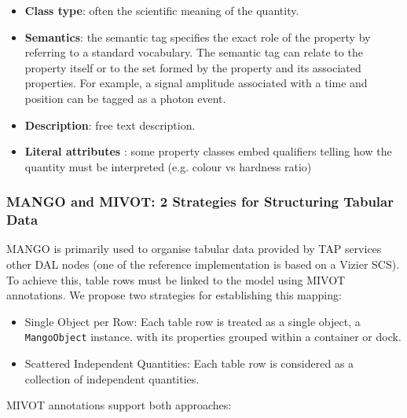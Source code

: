 \documentclass[11pt,a4paper]{ivoa}
\begin{document}
\begin{itemize}[noitemsep,topsep=0pt,parsep=0pt,partopsep=0pt]
    \item \textbf{Class type}: often the scientific meaning of the quantity.
    \item \textbf{Semantics}: the semantic tag specifies the exact role of the property by
          referring to a standard vocabulary. The semantic tag can relate to the property itself
          or to the set formed by the property and its associated properties.
          For example, a signal amplitude associated with a time and position can be tagged
          as a photon event.
    \item \textbf{Description}: free text description.
    \item \textbf{Literal attributes} : some property classes embed qualifiers telling 
          how the quantity must be interpreted (e.g. colour vs hardness ratio)
\end{itemize}


\subsubsection{MANGO and MIVOT: 2 Strategies for Structuring Tabular Data}

MANGO is primarily used to organise tabular data provided by TAP services \citep{2019ivoa.spec.0927D} 
other DAL nodes (one of the reference implementation is based on a Vizier SCS).
To achieve this, table rows must be linked to the model using MIVOT annotations.
We propose two strategies for establishing this mapping:
\begin{itemize}[noitemsep,topsep=0pt,parsep=0pt,partopsep=0pt]
    \item Single Object per Row: Each table row is treated as a single object, a \texttt{MangoObject} instance.
          with its properties grouped within a container or dock.
    \item Scattered Independent Quantities: Each table row is considered as a collection of independent quantities.
\end{itemize}

\hfill \break

MIVOT annotations support both approaches:
\end{document}

